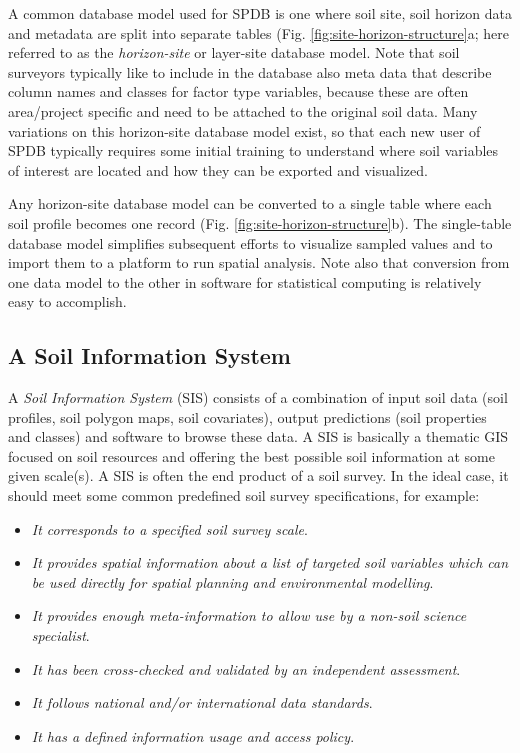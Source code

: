 \documentclass[graybox,natbib,nospthms,UStrade]{svmono}
\begin{document}
A common database model used for SPDB is one where soil site, soil
horizon data and metadata are split into separate tables
(Fig. \ref{fig:site-horizon-structure}a; here referred to as the
\emph{horizon-site} or layer-site database model. Note that soil surveyors
typically like to include in the database also meta data that describe
column names and classes for factor type variables, because these are
often area/project specific and need to be attached to the original soil
data. Many variations on this horizon-site database model exist, so that
each new user of SPDB typically requires some initial training to
understand where soil variables of interest are located and how they can
be exported and visualized.

Any horizon-site database model can be converted to a single table where each soil profile becomes
one record (Fig. \ref{fig:site-horizon-structure}b). The single-table
database model simplifies subsequent efforts to visualize sampled values
and to import them to a platform to run spatial analysis. Note also that
conversion from one data model to the other in software for statistical
computing is relatively easy to accomplish.

\hypertarget{a-soil-information-system}{%
\subsection{A Soil Information System}\label{a-soil-information-system}}

A \emph{Soil Information System} (SIS) consists of a combination of input
soil data (soil profiles, soil polygon maps, soil covariates), output
predictions (soil properties and classes) and software to browse these
data. A SIS is basically a thematic GIS focused on soil resources and
offering the best possible soil information at some given scale(s). A
SIS is often the end product of a soil survey. In the ideal case, it
should meet some common predefined soil survey specifications, for
example:

\begin{itemize}
\item
  \emph{It corresponds to a specified soil survey scale}.
\item
  \emph{It provides spatial information about a list of targeted soil
  variables which can be used directly for spatial planning and
  environmental modelling}.
\item
  \emph{It provides enough meta-information to allow use by a non-soil
  science specialist}.
\item
  \emph{It has been cross-checked and validated by an independent
  assessment}.
\item
  \emph{It follows national and/or international data standards}.
\item
  \emph{It has a defined information usage and access policy}.
\end{itemize}
\end{document}
